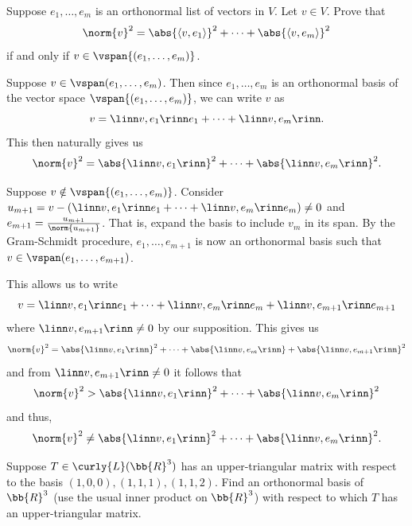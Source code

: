 \documentclass[12pt, letterpaper]{hmcpset}
\begin{document}
\pagebreak

\begin{problem}[2]
	Suppose $e_1, \ldots, e_m$ is an orthonormal list of vectors in $V$. Let $v \in V$. Prove that
	\[
		\norm{v}^2 = \abs{\langle v, e_1 \rangle}^2 + \cdots + \abs{\langle v, e_m \rangle}^2
	\]
	if and only if $v \in \vspan{(e_1, \ldots, e_m)}$.
\end{problem}

\begin{solution}
	Suppose $v \in \vspan(e_1, \ldots, e_m)$. Then since $e_1, \ldots, e_m$ is an orthonormal basis of the vector space $\vspan{(e_1, \ldots, e_m)}$, we can write $v$ as
	\[
		v = \linn v, e_1 \rinn e_1 + \cdots + \linn v, e_m \rinn.
	\]
	This then naturally gives us
	\[
		\norm{v}^2 = \abs{\linn v, e_1 \rinn}^2 + \cdots + \abs{\linn v, e_m \rinn}^2.
	\]

	Suppose $v \notin \vspan{(e_1, \ldots, e_m)}$. Consider $u_{m + 1} = v - (\linn v, e_1 \rinn e_1 + \cdots + \linn v, e_m \rinn e_m) \neq 0$ and $e_{m + 1} = \frac{u_{m + 1}}{\norm{u_{m + 1}}}$. That is, expand the basis to include $v_m$ in its span. By the Gram-Schmidt procedure, $e_1, \ldots, e_{m + 1}$ is now an orthonormal basis such that $v \in \vspan (e_1, \ldots, e_{m + 1})$.

	This allows us to write 
	\[
		v = \linn v, e_1 \rinn e_1 + \cdots + \linn v, e_m \rinn e_m + \linn v, e_{m + 1} \rinn e_{m + 1}
	\]
	where $\linn v, e_{m + 1} \rinn \neq 0$ by our supposition. This gives us 
	\[
		\norm{v}^2 = \abs{\linn v, e_1 \rinn}^2 + \cdots + \abs{\linn v, e_m \rinn} + \abs{\linn v, e_{m + 1} \rinn}^2
	\]
	and from $\linn v, e_{m + 1} \rinn \neq 0$ it follows that
	\[
		\norm{v}^2 > \abs{\linn v, e_1 \rinn}^2 + \cdots + \abs{\linn v, e_m \rinn}^2
	\]
	and thus,
	\[
		\norm{v}^2 \neq \abs{\linn v, e_1 \rinn}^2 + \cdots + \abs{\linn v, e_m \rinn}^2.
	\]
\end{solution}

\pagebreak

\begin{problem}[3]
	Suppose $T \in \curly{L}(\bb{R}^3)$ has an upper-triangular matrix with respect to the basis $(1, 0, 0), (1, 1, 1), (1, 1, 2)$. Find an orthonormal basis of $\bb{R}^3$ (use the usual inner product on $\bb{R}^3$) with respect to which $T$ has an upper-triangular matrix.
\end{problem}
\end{document}
